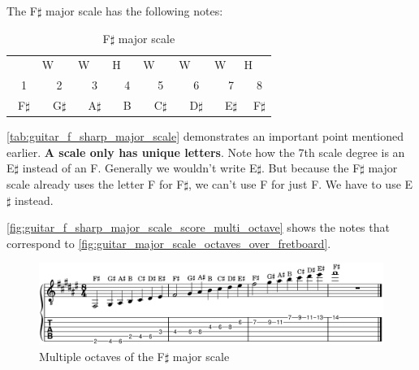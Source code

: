 The F$\sharp$ major scale has the following notes:

\begin{table}[h]
	\centering
	\begin{tabular}{*{16}{c}}
		& \multicolumn{2}{P{4mm}}{\large{W}} & \multicolumn{2}{P{4mm}}{\large{W}} & \multicolumn{2}{P{4mm}}{\large{H}} & \multicolumn{2}{P{4mm}}{\large{W}} & \multicolumn{2}{P{4mm}}{\large{W}} & \multicolumn{2}{P{4mm}}{\large{W}} & \multicolumn{2}{P{4mm}}{\large{H}} & \\
		\multicolumn{2}{P{4mm}}{1} & \multicolumn{2}{P{4mm}}{2} & \multicolumn{2}{P{4mm}}{3} & \multicolumn{2}{P{4mm}}{4} & \multicolumn{2}{P{4mm}}{5} & \multicolumn{2}{P{4mm}}{6} & \multicolumn{2}{P{4mm}}{7} & \multicolumn{2}{P{4mm}}{8} \\
		\multicolumn{2}{P{4mm}}{F$\sharp$} & \multicolumn{2}{P{4mm}}{G$\sharp$} & \multicolumn{2}{P{4mm}}{A$\sharp$} & \multicolumn{2}{P{4mm}}{B} & \multicolumn{2}{P{4mm}}{C$\sharp$} & \multicolumn{2}{P{4mm}}{D$\sharp$} & \multicolumn{2}{P{4mm}}{E$\sharp$} & \multicolumn{2}{P{4mm}}{F$\sharp$}
	\end{tabular}
	\caption{F$\sharp$ major scale}
	\label{tab:guitar_f_sharp_major_scale}
\end{table}

\autoref{tab:guitar_f_sharp_major_scale} demonstrates an important point mentioned earlier. \textbf{A scale only has unique letters}. Note how the 7th scale degree is an E$\sharp$ instead of an F. Generally we wouldn't write E$\sharp$. But because the F$\sharp$ major scale already uses the letter F for F$\sharp$, we can't use F for just F. We have to use E$\sharp$ instead.

\autoref{fig:guitar_f_sharp_major_scale_score_multi_octave} shows the notes that correspond to \autoref{fig:guitar_major_scale_octaves_over_fretboard}.

\begin{figure}[h]
	\centering
	\includegraphics[width=\textwidth]{../../MuseScore/Guitar/GuitarFSharpMajorMultiOctave.png}
	\caption{Multiple octaves of the F$\sharp$ major scale}
	\label{fig:guitar_f_sharp_major_scale_score_multi_octave}
\end{figure}

